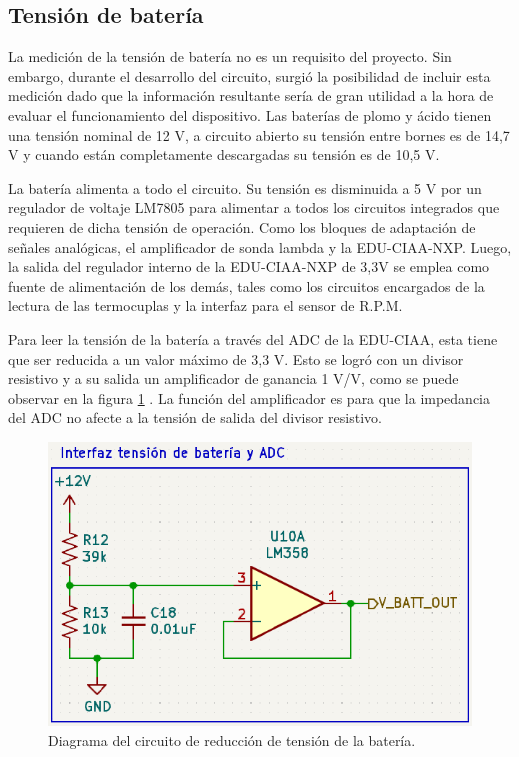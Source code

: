 \subsection{Tensión de batería}

La medición de la tensión de batería no es un requisito del proyecto. Sin embargo, durante el desarrollo del circuito, surgió la posibilidad de incluir esta medición dado que la información resultante sería de gran utilidad a la hora de evaluar el funcionamiento del dispositivo.
Las baterías de plomo y ácido tienen una tensión nominal de 12 V, a circuito abierto su tensión entre bornes es de 14,7 V y cuando están completamente descargadas su tensión es de 10,5 V.

La batería alimenta a todo el circuito. Su tensión es disminuida a 5 V por un regulador de voltaje LM7805 para alimentar a todos los circuitos integrados que requieren de dicha tensión de operación. Como los bloques de adaptación de señales analógicas, el amplificador de sonda lambda y la EDU-CIAA-NXP. Luego, la salida del regulador interno de la EDU-CIAA-NXP de 3,3V se emplea como fuente de alimentación de los demás, tales como los circuitos encargados de la lectura de las termocuplas y la interfaz para el sensor de R.P.M.

Para leer la tensión de la batería a través del ADC de la EDU-CIAA, esta tiene que ser reducida a un valor máximo de 3,3 V. Esto se logró con un divisor resistivo y a su salida un amplificador de ganancia 1 V/V, como se puede observar en la figura \ref{fig:circuito-bat} . La función del amplificador es para que la impedancia del ADC no afecte a la tensión de salida del divisor resistivo.

\begin{figure}[htpb]
\centering
\includegraphics[width=.7\textwidth]{./Figures/ampli-bat.png}
\caption{Diagrama del circuito de reducción de tensión de la batería.}
\label{fig:circuito-bat}
\end{figure}

